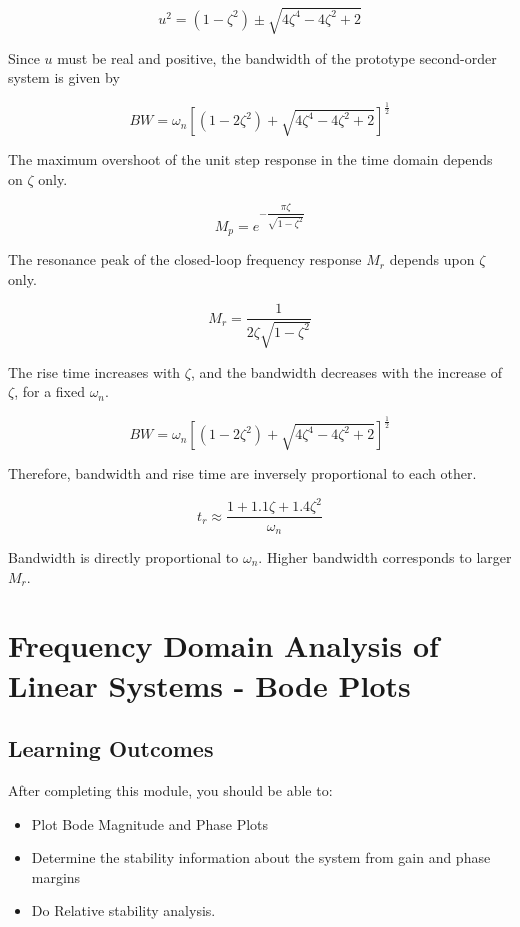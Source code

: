 \documentclass[
  14pt,
  a4paper,
  oneside,
  open=any,
  a4paper,
  14pt]{report}
\begin{document}
\[
    u^2 = (1-\zeta^2) \pm \sqrt{4\zeta^4 - 4\zeta^2 + 2}
\]

Since \(u\) must be real and positive, the bandwidth of the prototype
second-order system is given by

\[
    BW = \omega_n \left[(1-2\zeta^2) + \sqrt{4\zeta^4-4\zeta^2+2} \right]^{\frac{1}{2}}
\]

The maximum overshoot of the unit step response in the time domain
depends on \(\zeta\) only.

\[
    M_p = e^{-\dfrac{\pi\zeta}{\sqrt{1-\zeta^2}}}
\]

The resonance peak of the closed-loop frequency response \(M_r\) depends
upon \(\zeta\) only.

\[
    M_r = \dfrac{1}{2\zeta\sqrt{1-\zeta^2}}
\]

The rise time increases with \(\zeta\), and the bandwidth decreases with
the increase of \(\zeta\), for a fixed \(\omega_n\).

\[
    BW = \omega_n \left[(1-2\zeta^2) + \sqrt{4\zeta^4-4\zeta^2+2} \right]^{\frac{1}{2}}
\]

Therefore, bandwidth and rise time are inversely proportional to each
other.

\[
    t_r \approx \dfrac{1+1.1\zeta + 1.4\zeta^2}{\omega_n}
\]

Bandwidth is directly proportional to \(\omega_n\). Higher bandwidth
corresponds to larger \(M_r\).

\chapter{Frequency Domain Analysis of Linear Systems - Bode
Plots}\label{frequency-domain-analysis-of-linear-systems---bode-plots}

\section*{Learning Outcomes}\label{learning-outcomes-8}


After completing this module, you should be able to:

\begin{itemize}
\item
  Plot Bode Magnitude and Phase Plots
\item
  Determine the stability information about the system from gain and
  phase margins
\item
  Do Relative stability analysis.
\end{itemize}
\end{document}

